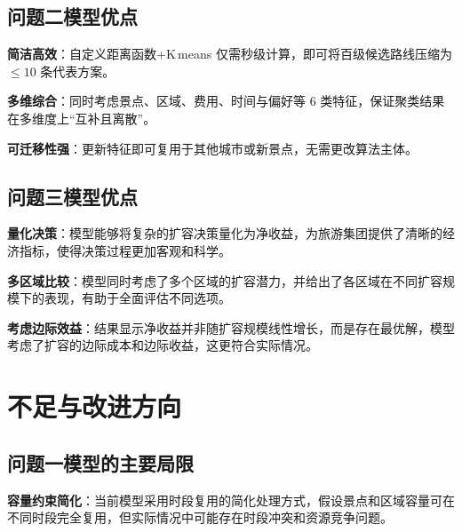 \subsection[\hspace{-2pt}问题二模型优点]{{\heiti{} \hspace{-8pt}问题二模型优点}}\label{subsection5: 问题二模型优点}

\noindent\textbf{简洁高效}：自定义距离函数+K\,means 仅需秒级计算，即可将百级候选路线压缩为 $\le 10$ 条代表方案。

\noindent\textbf{多维综合}：同时考虑景点、区域、费用、时间与偏好等 6 类特征，保证聚类结果在多维度上“互补且离散”。

\noindent\textbf{可迁移性强}：更新特征即可复用于其他城市或新景点，无需更改算法主体。

\subsection[\hspace{-2pt}问题三模型优点]{{\heiti{} \hspace{-8pt}问题三模型优点}}\label{subsection5: 问题三模型优点}

\noindent\textbf{量化决策}：模型能够将复杂的扩容决策量化为净收益，为旅游集团提供了清晰的经济指标，使得决策过程更加客观和科学。

\noindent\textbf{多区域比较}：模型同时考虑了多个区域的扩容潜力，并给出了各区域在不同扩容规模下的表现，有助于全面评估不同选项。

\noindent\textbf{考虑边际效益}：结果显示净收益并非随扩容规模线性增长，而是存在最优解，模型考虑了扩容的边际成本和边际收益，这更符合实际情况。
\section[\hspace{-2pt}不足与改进方向]{{\heiti{} \hspace{-8pt}不足与改进方向}}\label{section5: 不足与改进方向}

\subsection[\hspace{-2pt}问题一模型的主要局限]{{\heiti{} \hspace{-8pt}问题一模型的主要局限}}\label{subsection5: 问题一模型局限}

\noindent\textbf{容量约束简化}：当前模型采用时段复用的简化处理方式，假设景点和区域容量可在不同时段完全复用，但实际情况中可能存在时段冲突和资源竞争问题。

